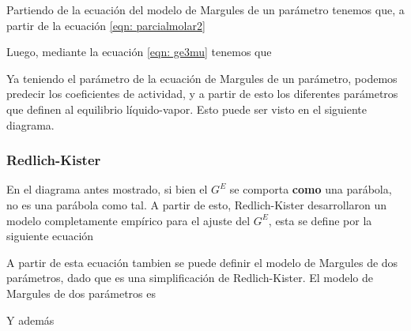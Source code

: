 Partiendo de la ecuación del modelo de Margules de un parámetro tenemos que, a partir de la ecuación \ref{eqn: parcialmolar2}


Luego, mediante la ecuación \ref{eqn: ge3mu} tenemos que


Ya teniendo el parámetro de la ecuación de Margules de un parámetro, podemos predecir los coeficientes de actividad, y a partir de esto los diferentes parámetros que definen al equilibrio líquido-vapor. 
Esto puede ser visto en el siguiente diagrama.


\subsubsection{Redlich-Kister}

En el diagrama antes mostrado, si bien el $G^{E}$ se comporta \textbf{como} una parábola, no es una parábola como tal. A partir de esto, Redlich-Kister desarrollaron
un modelo completamente empírico para el ajuste del $G^{E}$, esta se define por la siguiente ecuación


A partir de esta ecuación tambien se puede definir el modelo de Margules de dos parámetros, dado que es una simplificación de Redlich-Kister.
El modelo de Margules de dos parámetros es 


Y además
